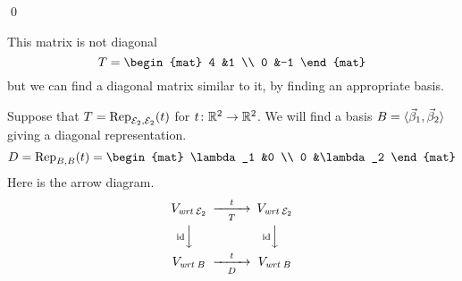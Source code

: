 \begin{frame}
\lm[lm:DiagIffBasisOfEigens]

\pause
\pf
{}  
\qed
\end{frame}

\begin{frame}
\ex
This matrix is not diagonal
\begin{equation*}
  T=
  \begin{mat}
    4  &1  \\
    0  &-1
  \end{mat}
\end{equation*}
but we can
find a diagonal matrix similar to it, by finding an appropriate basis.

\pause
Suppose that $T=\rep{t}{\stdbasis_2,\stdbasis_2}$ for $\map{t}{\Re^2}{\Re^2}$.
We will find a basis $B=\sequence{\vec{\beta}_1,\vec{\beta}_2}$ giving a 
diagonal representation.
\begin{equation*}
  D=\rep{t}{B,B}=
  \begin{mat}
    \lambda_1  &0 \\
    0    &\lambda_2
  \end{mat}
\end{equation*}
Here is the arrow diagram.
\begin{equation*}
  \begin{CD}
    V_{\wrt{\stdbasis_2}}            @>t>T>        V_{\wrt{\stdbasis_2}}       \\
    @V{\scriptstyle\identity} VV              @V{\scriptstyle\identity} VV \\
    V_{\wrt{B}}                   @>t>D>        V_{\wrt{B}}
  \end{CD}
\end{equation*}
\end{frame}
